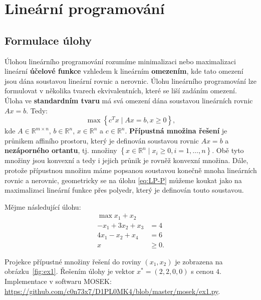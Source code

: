\chapter{Lineární programování}

\section{Formulace úlohy}

Úlohou lineárního programování rozumíme minimalizaci nebo maximalizaci lineární \textbf{účelové funkce} vzhledem k lineárním \textbf{omezením}, kde tato omezení jsou dána soustavou lineární rovnic a nerovnic. Úlohu lineárního programování lze formulovat v několika tvarech ekvivalentních, které se liší zadáním omezení. Úloha ve \textbf{standardním tvaru} má svá omezení dána soustavou lineárních rovnic $Ax = b$. Tedy:
\begin{equation}\tag{LP-P}
    \max \left\{ c^T x \mid Ax = b, x \geq 0 \right\},
    \label{eq:LP-P}
\end{equation}
kde $A \in \mathbb{R}^{m \times n}$, $b \in \mathbb{R}^n$, $x \in \mathbb{R}^n$ a $c \in \mathbb{R}^n$. \textbf{Přípustná množina řešení} je průnikem affiního prostoru, který je definován soustavou rovnic $Ax = b$ a \textbf{nezáporného ortantu}, tj. množiny $\left\{ x \in \mathbb{R}^n \mid x_i \geq 0, i = 1, \dots, n \right\}$. Obě tyto množiny jsou konvexní a tedy i jejich průnik je rovněž konvexní množina. Dále, protože přípustnou množinu máme popsanou soustavou konečně mnoha lineárních rovnic a nerovnic, geometricky se na úlohu \ref{eq:LP-P} můžeme koukat jako na maximalizaci lineární funkce přes polyedr, který je definován touto soustavou.

\begin{pr}
Mějme následující úlohu:
\begin{equation}\tag{P1}
    \begin{split}
        \max x_1 + x_2      & \\
        - x_1 + 3 x_2 + x_3 &= 4 \\
        4 x_1 -   x_2 + x_4 &= 6 \\
        x &\geq 0.
    \end{split}
    \label{eq:P1}
\end{equation}

Projekce přípustné množiny řešení do roviny $(x_1, x_2)$ je zobrazena na obrázku~\ref{fig:ex1}. Řešením úlohy je vektor $x^* = (2, 2, 0, 0)$ s cenou $4$. Implementace v softwaru MOSEK: \url{https://github.com/c0n73x7/D1PL0MK4/blob/master/mosek/ex1.py}.
\end{pr}

